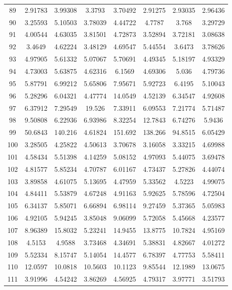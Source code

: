 \begin{center}
\begin{longtable}{cccccccc}
89 & 2.91783 & 3.99308 & 3.3793 & 3.70492 & 2.91275 & 2.93035 & 2.96436\\
90 & 3.25593 & 5.10503 & 3.78039 & 4.44722 & 4.7787 & 3.768 & 3.29729\\
91 & 4.00544 & 4.63035 & 3.81501 & 4.72873 & 3.52894 & 3.72181 & 3.08638\\
92 & 3.4649 & 4.62224 & 3.48129 & 4.69547 & 5.44554 & 3.6473 & 3.78626\\
93 & 4.97905 & 5.61332 & 5.07067 & 5.70691 & 4.49345 & 5.18197 & 4.93329\\
94 & 4.73003 & 5.63875 & 4.62316 & 6.1569 & 4.69306 & 5.036 & 4.79736\\
95 & 5.87791 & 6.99212 & 5.65806 & 7.95671 & 5.92723 & 6.4195 & 5.10043\\
96 & 5.28296 & 6.04321 & 4.47774 & 14.0549 & 4.52139 & 6.34547 & 4.92608\\
97 & 6.37912 & 7.29549 & 19.526 & 7.33911 & 6.09553 & 7.21774 & 5.71487\\
98 & 9.50808 & 6.22936 & 6.93986 & 8.32254 & 12.7843 & 6.74276 & 5.9436\\
99 & 50.6843 & 140.216 & 4.61824 & 151.692 & 138.266 & 94.8515 & 6.05429\\
100 & 3.28505 & 4.25822 & 4.50613 & 3.70678 & 3.16058 & 3.33215 & 4.69988\\
101 & 4.58434 & 5.51398 & 4.14259 & 5.08152 & 4.97093 & 5.44075 & 3.69478\\
102 & 4.81577 & 5.85234 & 4.70787 & 6.01167 & 4.73437 & 5.27826 & 4.44074\\
103 & 3.89858 & 4.61075 & 5.13695 & 4.47959 & 5.33562 & 4.5223 & 4.99075\\
104 & 4.84411 & 5.53879 & 4.67248 & 4.91163 & 5.92625 & 5.78596 & 4.72504\\
105 & 6.34137 & 5.85071 & 6.66894 & 6.98114 & 9.27459 & 5.37365 & 5.05983\\
106 & 4.92105 & 5.94245 & 3.85048 & 9.06099 & 5.72058 & 5.45668 & 4.23577\\
107 & 8.96389 & 15.8032 & 5.23241 & 14.9455 & 13.8775 & 10.7824 & 4.95169\\
108 & 4.5153 & 4.9588 & 3.73468 & 4.34691 & 5.38831 & 4.82667 & 4.01272\\
109 & 5.52334 & 8.15747 & 5.14054 & 14.4577 & 6.78397 & 4.77753 & 5.58411\\
110 & 12.0597 & 10.0818 & 10.5603 & 10.1123 & 9.85544 & 12.1989 & 13.0675\\
111 & 3.91996 & 4.54242 & 3.86269 & 4.56925 & 4.79317 & 3.97771 & 3.51793\\

\end{longtable}
\end{center}
